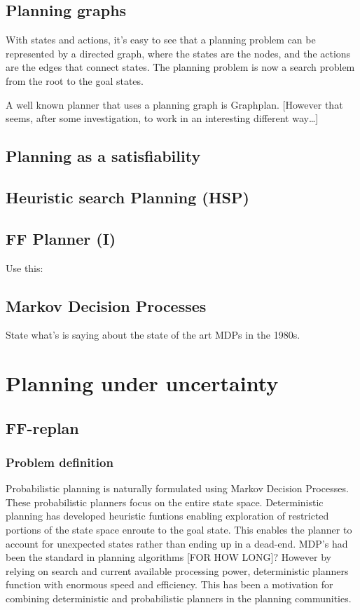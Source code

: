\documentclass[runningheads,a4paper]{llncs}
\begin{document}
\subsection{Planning graphs}

With states and actions, it's easy to see that a planning problem can be
represented by a directed graph, where the states are the nodes, and the
actions are the edges that connect states. The planning problem is now
a search problem from the root to the goal states.

A well known planner that uses a planning graph is Graphplan.
[However that seems, after some investigation, to work in an interesting
different way\ldots]

\subsection{Planning as a satisfiability}

\subsection{Heuristic search Planning (HSP)}

\subsection{FF Planner (I)}
Use this: \cite{Hoffmann01theff}

\subsection{Markov Decision Processes}

State what's \cite{monahan1982state} is saying about the state of the art MDPs
in the 1980s.



\section{Planning under uncertainty}

\subsection{FF-replan \cite{FFReplan}}

\subsubsection{Problem definition}
Probabilistic planning is naturally formulated using Markov Decision Processes. These probabilistic planners focus on the entire state space. Deterministic planning has developed heuristic funtions enabling exploration of restricted portions of the state space enroute to the goal state. This enables the planner to account for unexpected states rather than ending up in a dead-end. MDP's had been the standard in planning algorithms [FOR HOW LONG]? However by relying on search and current available processing power, deterministic planners function with enormous speed and efficiency. This has been a motivation for combining deterministic and probabilistic planners in the planning communities.
\end{document}
